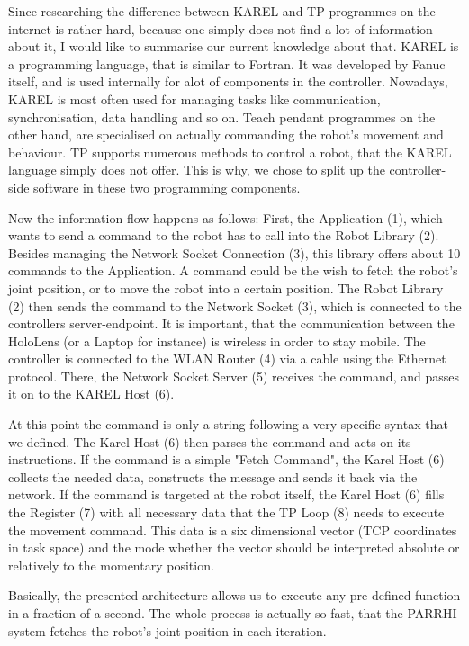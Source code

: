 Since researching the difference between KAREL and TP programmes on the internet is rather hard, because one simply does not find a lot of information about it, I would like to summarise our current knowledge about that. KAREL is a programming language, that is similar to Fortran. It was developed by Fanuc itself, and is used internally for alot of components in the controller. Nowadays, KAREL is most often used for managing tasks like communication, synchronisation, data handling and so on. Teach pendant programmes on the other hand, are specialised on actually commanding the robot's movement and behaviour. TP supports numerous methods to control a robot, that the KAREL language simply does not offer. This is why, we chose to split up the controller-side software in these two programming components.

Now the information flow happens as follows: First, the Application (1), which wants to send a command to the robot has to call into the Robot Library (2). Besides managing the Network Socket Connection (3), this library offers about 10 commands to the Application. A command could be the wish to fetch the robot's joint position, or to move the robot into a certain position. The Robot Library (2) then sends the command to the Network Socket (3), which is connected to the controllers server-endpoint. It is important, that the communication between the HoloLens (or a Laptop for instance) is wireless in order to stay mobile. The controller is connected to the WLAN Router (4) via a cable using the Ethernet protocol. There, the Network Socket Server (5) receives the command, and passes it on to the KAREL Host (6). 

At this point the command is only a string following a very specific syntax that we defined. The Karel Host (6) then parses the command and acts on its instructions. If the command is a simple "Fetch Command", the Karel Host (6) collects the needed data, constructs the message and sends it back via the network. If the command is targeted at the robot itself, the Karel Host (6) fills the Register (7) with all necessary data that the TP Loop (8) needs to execute the movement command. This data is a six dimensional vector (TCP coordinates in task space) and the mode whether the vector should be interpreted absolute or relatively to the momentary position.

Basically, the presented architecture allows us to execute any pre-defined function in a fraction of a second. The whole process is actually so fast, that the PARRHI system fetches the robot's joint position in each iteration.

